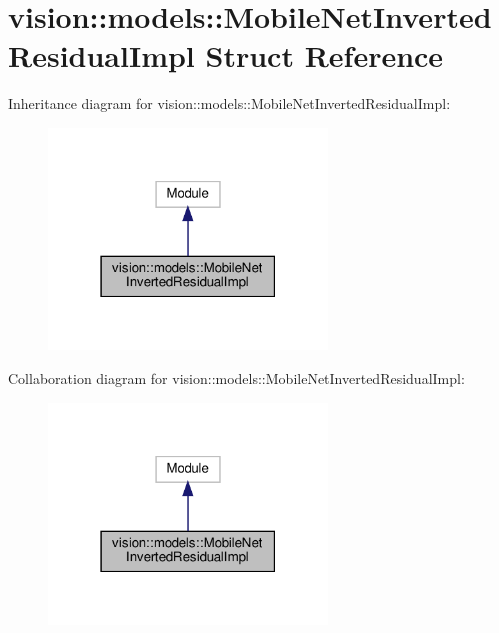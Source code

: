 \hypertarget{structvision_1_1models_1_1MobileNetInvertedResidualImpl}{}\section{vision\+:\+:models\+:\+:Mobile\+Net\+Inverted\+Residual\+Impl Struct Reference}
\label{structvision_1_1models_1_1MobileNetInvertedResidualImpl}


Inheritance diagram for vision\+:\+:models\+:\+:Mobile\+Net\+Inverted\+Residual\+Impl\+:
\nopagebreak
\begin{figure}[H]
\begin{center}
\leavevmode
\includegraphics[width=210pt]{structvision_1_1models_1_1MobileNetInvertedResidualImpl__inherit__graph}
\end{center}
\end{figure}


Collaboration diagram for vision\+:\+:models\+:\+:Mobile\+Net\+Inverted\+Residual\+Impl\+:
\nopagebreak
\begin{figure}[H]
\begin{center}
\leavevmode
\includegraphics[width=210pt]{structvision_1_1models_1_1MobileNetInvertedResidualImpl__coll__graph}
\end{center}
\end{figure}
